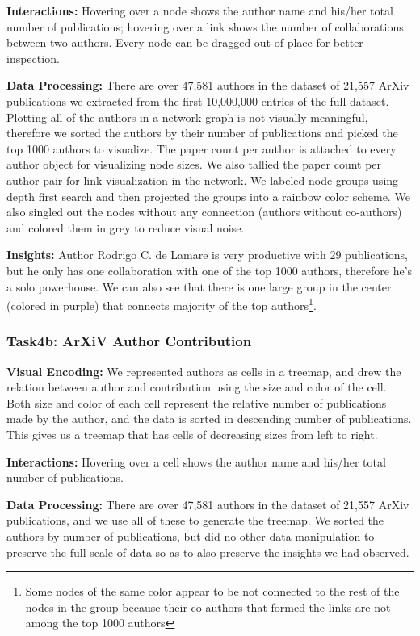 \documentclass{article}
\begin{document}
\textbf{Interactions:} Hovering over a node shows the author name and his/her total number of publications; hovering over a link shows the number of collaborations between two authors. Every node can be dragged out of place for better inspection.

\textbf{Data Processing:} There are over 47,581 authors in the dataset of 21,557 ArXiv publications we extracted from the first 10,000,000 entries of the full dataset. Plotting all of the authors in a network graph is not visually meaningful, therefore we sorted the authors by their number of publications and picked the top 1000 authors to visualize. The paper count per author is attached to every author object for visualizing node sizes. We also tallied the paper count per author pair for link visualization in the network. We labeled node groups using depth first search and then projected the groups into a rainbow color scheme. We also singled out the nodes without any connection (authors without co-authors) and colored them in grey to reduce visual noise.

\textbf{Insights:} Author Rodrigo C. de Lamare is very productive with 29 publications, but he only has one collaboration with one of the top 1000 authors, therefore he's a solo powerhouse. We can also see that there is one large group in the center (colored in purple) that connects majority of the top authors\footnote{Some nodes of the same color appear to be not connected to the rest of the nodes in the group because their co-authors that formed the links are not among the top 1000 authors}.

\subsubsection*{Task4b: ArXiV Author Contribution}
\textbf{Visual Encoding:} We represented authors as cells in a treemap, and drew the relation between author and contribution using the size and color of the cell. Both size and color of each cell represent the relative number of publications made by the author, and the data is sorted in descending number of publications. This gives us a treemap that has cells of decreasing sizes from left to right. 

\textbf{Interactions:} Hovering over a cell shows the author name and his/her total number of publications. 

\textbf{Data Processing:} There are over 47,581 authors in the dataset of 21,557 ArXiv publications, and we use all of these to generate the treemap. We sorted the authors by number of publications, but did no other data manipulation to preserve the full scale of data so as to also preserve the insights we had observed. 
\end{document}
